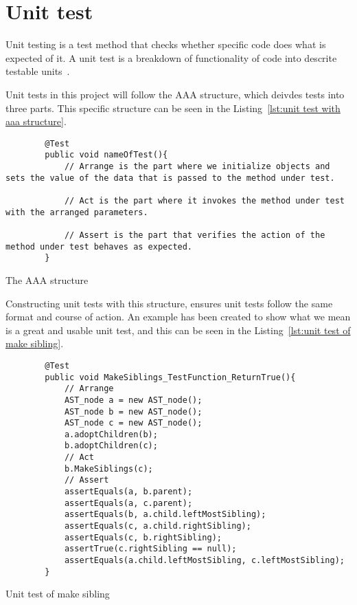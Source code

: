 \section{Unit test}\label{subsec:unittest}
Unit testing is a test method that checks whether specific code does what is expected of it. A unit test is a breakdown of functionality of code into descrite testable units~\cite{UnitTestBasic}.

Unit tests in this project will follow the AAA structure, which deivdes tests into three parts. This specific structure can be seen in the Listing~\ref{lst:unit test with aaa structure}.

\begin{listing}[htb!]
    \begin{verbatim}
        @Test
        public void nameOfTest(){
            // Arrange is the part where we initialize objects and sets the value of the data that is passed to the method under test.

            // Act is the part where it invokes the method under test with the arranged parameters.

            // Assert is the part that verifies the action of the method under test behaves as expected. 
        }
    \end{verbatim}
    \caption{The AAA structure}
    \label{lst:unit test with aaa structure}
\end{listing}

Constructing unit tests with this structure, ensures unit tests follow the same format and course of action. An example has been created to show what we mean is a great and usable unit test, and this can be seen in the Listing~\ref{lst:unit test of make sibling}.

\begin{listing}[htb!]
    \begin{verbatim}
        @Test
        public void MakeSiblings_TestFunction_ReturnTrue(){
            // Arrange
            AST_node a = new AST_node();
            AST_node b = new AST_node();
            AST_node c = new AST_node();
            a.adoptChildren(b);
            b.adoptChildren(c);
            // Act
            b.MakeSiblings(c);
            // Assert
            assertEquals(a, b.parent);
            assertEquals(a, c.parent);
            assertEquals(b, a.child.leftMostSibling);
            assertEquals(c, a.child.rightSibling);
            assertEquals(c, b.rightSibling);
            assertTrue(c.rightSibling == null);
            assertEquals(a.child.leftMostSibling, c.leftMostSibling);
        }
    \end{verbatim}
    \caption{Unit test of make sibling}
    \label{lst:unit test of make sibling}
\end{listing}

